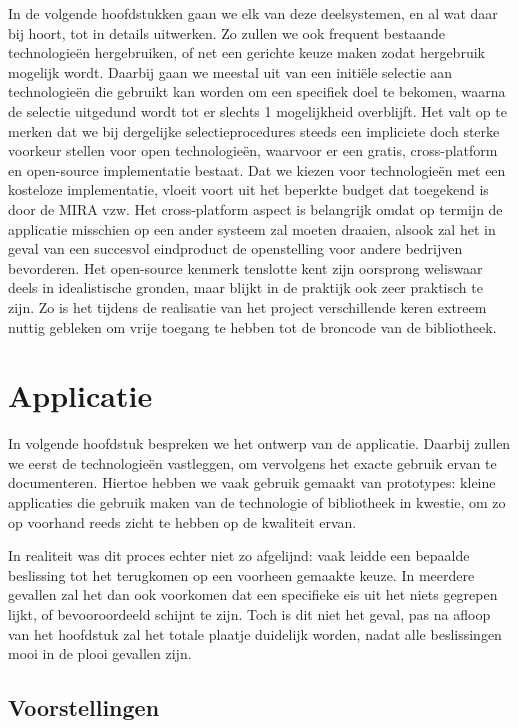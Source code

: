 In de volgende hoofdstukken gaan we elk van deze deelsystemen, en al wat daar bij hoort, tot in details uitwerken. Zo zullen we ook frequent bestaande technologieën hergebruiken, of net een gerichte keuze maken zodat hergebruik mogelijk wordt. Daarbij gaan we meestal uit van een initiële selectie aan technologieën die gebruikt kan worden om een specifiek doel te bekomen, waarna de selectie uitgedund wordt tot er slechts 1 mogelijkheid overblijft. Het valt op te merken dat we bij dergelijke selectieprocedures steeds een impliciete doch sterke voorkeur stellen voor open technologieën, waarvoor er een gratis, cross-platform en open-source implementatie bestaat. Dat we kiezen voor technologieën met een kosteloze implementatie, vloeit voort uit het beperkte budget dat toegekend is door de MIRA vzw. Het cross-platform aspect is belangrijk omdat op termijn de applicatie misschien op een ander systeem zal moeten draaien, alsook zal het in geval van een succesvol eindproduct de openstelling voor andere bedrijven bevorderen. Het open-source kenmerk tenslotte kent zijn oorsprong weliswaar deels in idealistische gronden, maar blijkt in de praktijk ook zeer praktisch te zijn. Zo is het tijdens de realisatie van het project verschillende keren extreem nuttig gebleken om vrije toegang te hebben tot de broncode van de bibliotheek.


%
%

\chapter{Applicatie}
\label{ontwerp:applicatie}

In volgende hoofdstuk bespreken we het ontwerp van de applicatie. Daarbij zullen we eerst de technologieën vastleggen, om vervolgens het exacte gebruik ervan te documenteren. Hiertoe hebben we vaak gebruik gemaakt van prototypes: kleine applicaties die gebruik maken van de technologie of bibliotheek in kwestie, om zo op voorhand reeds zicht te hebben op de kwaliteit ervan.

In realiteit was dit proces echter niet zo afgelijnd: vaak leidde een bepaalde beslissing tot het terugkomen op een voorheen gemaakte keuze. In meerdere gevallen zal het dan ook voorkomen dat een specifieke eis uit het niets gegrepen lijkt, of bevooroordeeld schijnt te zijn. Toch is dit niet het geval, pas na afloop van het hoofdstuk zal het totale plaatje duidelijk worden, nadat alle beslissingen mooi in de plooi gevallen zijn.

\section{Voorstellingen}
\label{ontwerp:applicatie:voorstellingen}

